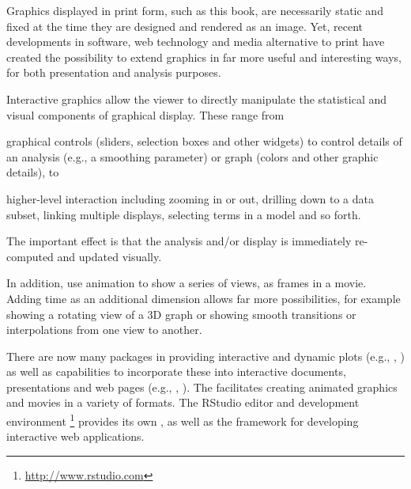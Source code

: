 \documentclass[11pt]{book}
\begin{document}

Graphics displayed in print form, such as this book, are necessarily static
and fixed at the time they are designed and rendered as an image.
Yet, recent developments in software, web technology and media
alternative to print have created the possibility to extend graphics
in far more useful and interesting ways, for both presentation
and analysis purposes.

Interactive graphics
allow the viewer to directly manipulate the
statistical and visual components of graphical display.  These
range from 
\begin{itemize*}
\item graphical controls (sliders, selection boxes and other widgets) 
to control details of an analysis (e.g., a smoothing parameter) or graph 
(colors and other graphic details), to
\item higher-level interaction including zooming in or out,
drilling down to a data subset, 
linking multiple displays, selecting terms in a model and so forth.
\end{itemize*}
The important effect is that the analysis and/or display is immediately
re-computed and updated visually.

In addition,  use animation to show a series of
views, as frames in a movie.  Adding time as an additional
dimension allows far more possibilities, for example 
showing a rotating view of a 3D graph or showing smooth transitions
or interpolations from one view to another.

There are now many packages in \R providing interactive and dynamic plots
(e.g., , )
as well as capabilities to incorporate these into interactive documents,
presentations and web pages (e.g., , ).
The  facilitates creating animated graphics  and movies in a
variety of formats.
The RStudio editor and development environment%
\footnote{\url{http://www.rstudio.com}}
provides its own
, as well as the  framework for
developing interactive \R web applications.
\end{document}

